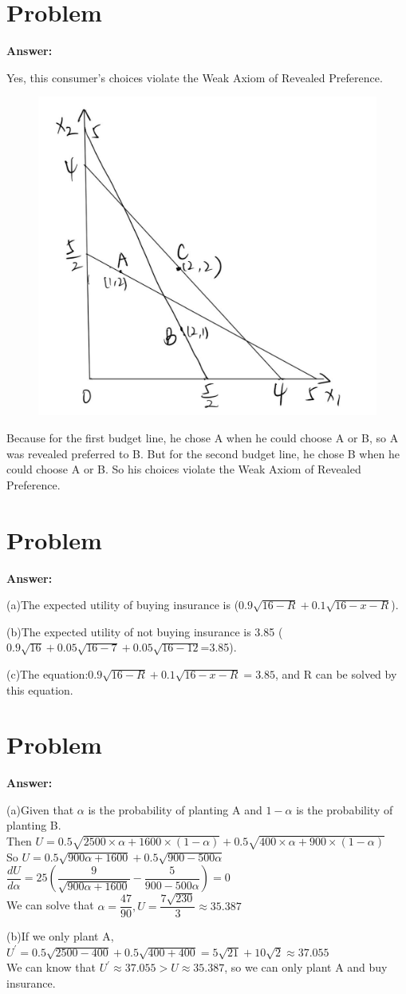 \documentclass[a4 paper,12pt]{article}
\begin{document}
\section{Problem}
\noindent
\textbf{Answer:}
\par Yes, this consumer’s choices violate the Weak Axiom of Revealed Preference. 
\begin{figure}[H]
    	\begin{center}
    		\includegraphics[width=0.5\linewidth]{pic/5.jpg}
    	\end{center}
    \end{figure}
\par Because for the first budget line, he chose A when he could choose A or B, so A was revealed preferred to B. But for the second budget line, he chose B when he could choose A or B. So his choices violate the Weak Axiom of Revealed Preference.
\section{Problem}
\noindent
\textbf{Answer:}
\par (a)The expected utility of buying insurance  is  \quad($0.9\sqrt{16-R}+0.1\sqrt{16-x-R}$).
\par (b)The expected utility of not buying insurance is 3.85 ($0.9\sqrt{16}+0.05\sqrt{16-7}+0.05\sqrt{16-12}$=3.85).
\par (c)The equation:\quad$0.9\sqrt{16-R}+0.1\sqrt{16-x-R}=3.85$, and R can be solved by this equation. 
\section{Problem}
\noindent
\textbf{Answer:}
\par(a)Given that $\alpha$ is the probability of planting A and $1-\alpha$ is the probability of planting B.\\
Then $U=0.5\sqrt{2500\times\alpha+1600\times(1-\alpha)}+0.5\sqrt{400\times\alpha+900\times(1-\alpha)}$\\
So $U=0.5\sqrt{900\alpha+1600}+0.5\sqrt{900-500\alpha}$\\
$\dfrac{dU}{d\alpha}=25(\dfrac{9}{\sqrt{900\alpha+1600}}-\dfrac{5}{900-500\alpha})=0$\\
We can solve that $\alpha=\dfrac{47}{90},U=\dfrac{7\sqrt{230}}{3}\approx35.387$
\par (b)If we only plant A,\quad$U^{\prime}=0.5\sqrt{2500-400}+0.5\sqrt{400+400}=5\sqrt{21}+10\sqrt{2}\approx37.055$\\
We can know that $U^{\prime}\approx37.055>U\approx 35.387$, so we can only plant A and buy insurance.
\end{document}
